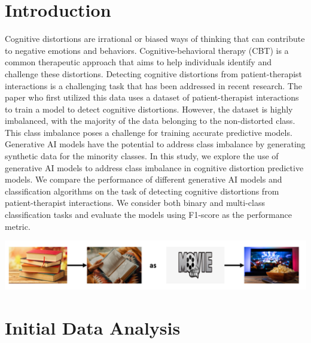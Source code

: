 \documentclass[a0,landscape]{a0poster}
\begin{document}
\begin{multicols}{4}
\color{Teal}

\section*{Introduction}
\color{Black}

Cognitive distortions are irrational or biased ways of thinking that can contribute to negative emotions and behaviors. Cognitive-behavioral therapy (CBT) is a common 
therapeutic approach that aims to help individuals identify and challenge these distortions. Detecting cognitive distortions from patient-therapist interactions is a 
challenging task that has been addressed in recent research. The paper who first utilized this data\cite{original_paper} uses a dataset of patient-therapist interactions to train a 
model to detect cognitive distortions. However, the dataset is highly imbalanced, with the majority of the data belonging to the non-distorted class. This class 
imbalance poses a challenge for training accurate predictive models. Generative AI models have the potential to address class imbalance by generating synthetic data 
for the minority classes. In this study, we explore the use of generative AI models to address class imbalance in cognitive distortion predictive models. We compare 
the performance of different generative AI models and classification algorithms on the task of detecting cognitive distortions from patient-therapist interactions. 
We consider both binary and multi-class classification tasks and evaluate the models using F1-score as the performance metric.

\begin{center}\vspace{0.5cm}
\includegraphics[width=0.99\linewidth]{Example.png}
\end{center}\vspace{0.5cm}

\color{Teal}
\section*{Initial Data Analysis}
\color{Black}


\end{multicols}
\end{document}
